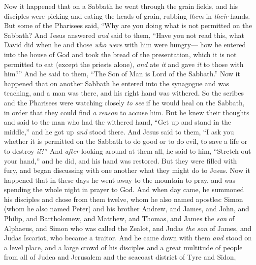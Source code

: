 \begin{biblechapter} %
 Now it happened that on a Sabbath he went through the grain fields, and his disciples were picking and eating the heads of grain, rubbing \textit{them} in \textit{their} hands.
\verse But some of the Pharisees said, “Why are you doing what is not permitted on the Sabbath?
\verse And Jesus answered \textit{and} said to them, “Have you not read this, what David did when he and those \textit{who were} with him were hungry—
\verse how he entered into the house of God and took the bread of the presentation, which it is not permitted to eat (except the priests alone), \textit{and} ate \textit{it} and gave \textit{it} to those with him?”
\verse And he said to them, “The Son of Man is Lord of the Sabbath.”
 Now it happened that on another Sabbath he entered into the synagogue and was teaching, and a man was there, and his right hand was withered.
\verse So the scribes and the Pharisees were watching closely \textit{to see} if he would heal on the Sabbath, in order that they could find \textit{a reason} to accuse him.
\verse But he knew their thoughts and said to the man who had the withered hand, “Get up and stand in the middle,” and he got up \textit{and} stood there.
\verse And Jesus said to them, “I ask you whether it is permitted on the Sabbath to do good or to do evil, to save a life or to destroy \textit{it}?”
\verse And \textit{after} looking around at them all, he said to him, “Stretch out your hand,” and he did, and his hand was restored.
\verse But they were filled with fury, and began discussing with one another what they might do to Jesus.
 Now it happened that in these days he went away to the mountain to pray, and was spending the whole night in prayer to God.
\verse And when day came, he summoned his disciples and chose from them twelve, whom he also named apostles:
\verse Simon (whom he also named Peter) and his brother Andrew, and James, and John, and Philip, and Bartholomew,
\verse and Matthew, and Thomas, and James the \textit{son} of Alphaeus, and Simon who was called the Zealot,
\verse and Judas \textit{the son} of James, and Judas Iscariot, who became a traitor.
 And he came down with them \textit{and} stood on a level place, and a large crowd of his disciples and a great multitude of people from all of Judea and Jerusalem and the seacoast district of Tyre and Sidon,

\end{biblechapter}
